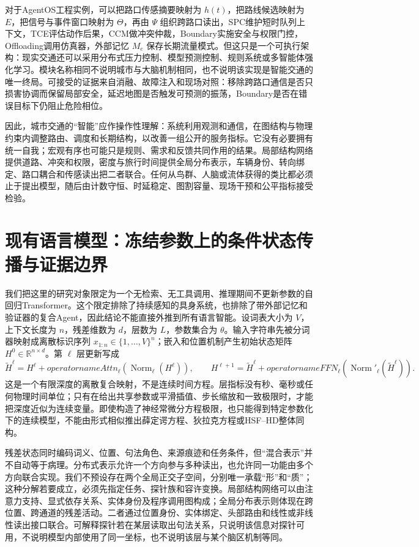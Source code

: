 对于AgentOS工程实例，可以把路口传感摘要映射为 $h(t)$，把路线候选映射为 $E$，把信号与事件窗口映射为 $\Theta$，再由 $\Psi$ 组织跨路口读出，SPC维护短时队列上下文，TCE评估动作后果，CCM做冲突仲裁，Boundary实施安全与权限门控，Offloading调用仿真器，外部记忆 $M_e$ 保存长期流量模式。但这只是一个可执行架构：现实交通还可以采用分布式压力控制、模型预测控制、规则系统或多智能体强化学习。模块名称相同不说明城市与大脑机制相同，也不说明该实现是智能交通的唯一终局。可接受的证据来自消融、故障注入和现场对照：移除跨路口通信是否只损害协调而保留局部安全，延迟地图是否触发可预测的振荡，Boundary是否在错误目标下仍阻止危险相位。

因此，城市交通的“智能”应作操作性理解：系统利用观测和通信，在图结构与物理约束内调整路由、调度和长期结构，以改善一组公开的服务指标。它没有必要拥有统一自我；宏观有序也可能只是规则、需求和反馈共同作用的结果。局部结构网络提供道路、冲突和权限，密度与旅行时间提供全局分布表示，车辆身份、转向绑定、路口耦合和传感读出把二者联合。任何从鸟群、人脑或流体获得的类比都必须止于提出模型，随后由计数守恒、时延稳定、图割容量、现场干预和公平指标接受检验。

\section{现有语言模型：冻结参数上的条件状态传播与证据边界}
\label{sec:section_4389}

我们把这里的研究对象限定为一个无检索、无工具调用、推理期间不更新参数的自回归Transformer。这个限定排除了持续感知的具身系统，也排除了带外部记忆和验证器的复合Agent，因此结论不能直接外推到所有语言智能。设词表大小为 $V$，上下文长度为 $n$，残差维数为 $d$，层数为 $L$，参数集合为 $\theta$。输入字符串先被分词器映射成离散标识序列 $x_{1:n}\in\{1,\ldots,V\}^n$；嵌入和位置机制产生初始状态矩阵 $H^0\in\mathbb R^{n\times d}$。第 $\ell$ 层更新写成
\[
\widetilde H^\ell=H^\ell+operatorname{Attn}_\ell
(\operatorname{Norm}_\ell(H^\ell)),
\qquad
H^{\ell+1}=\widetilde H^\ell+operatorname{FFN}_\ell
(\operatorname{Norm}'_\ell(\widetilde H^\ell)).
\]
这是一个有限深度的离散复合映射，不是连续时间方程。层指标没有秒、毫秒或任何物理时间单位；只有在给出共享参数或平滑插值、步长缩放和一致极限时，才能把深度近似为连续变量。即使构造了神经常微分方程极限，也只能得到特定参数化下的连续模型，不能由形式相似推出薛定谔方程、狄拉克方程或HSF--HD整体同构。

残差状态同时编码词义、位置、句法角色、来源痕迹和任务条件，但“混合表示”并不自动等于病理。分布式表示允许一个方向参与多种读出，也允许同一功能由多个方向联合实现。我们不预设存在两个全局正交子空间，分别唯一承载“形”和“质”；这种分解若要成立，必须先指定任务、探针族和容许变换。局部结构网络可以由注意力支持、显式依存关系、实体身份及程序调用图构成；全局分布表示则体现在跨位置、跨通道的残差活动。二者通过位置身份、实体绑定、头部路由和线性或非线性读出接口联合。可解释探针若在某层读取出句法关系，只说明该信息对探针可用，不说明模型内部使用了同一坐标，也不说明该层与某个脑区机制等同。

